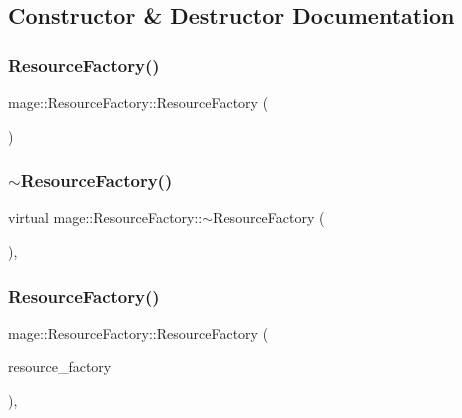 \subsection{Constructor \& Destructor Documentation}
\hypertarget{classmage_1_1_resource_factory_a340bde81096427e319b60063ae771a0d}{}\label{classmage_1_1_resource_factory_a340bde81096427e319b60063ae771a0d} 
\subsubsection{\texorpdfstring{Resource\+Factory()}{ResourceFactory()}\hspace{0.1cm}{\footnotesize\ttfamily [1/2]}}
{\footnotesize\ttfamily mage\+::\+Resource\+Factory\+::\+Resource\+Factory (\begin{DoxyParamCaption}{ }\end{DoxyParamCaption})}

\hypertarget{classmage_1_1_resource_factory_a07b50ac86226772e3c7d119ff9e10043}{}\label{classmage_1_1_resource_factory_a07b50ac86226772e3c7d119ff9e10043} 
\subsubsection{\texorpdfstring{$\sim$\+Resource\+Factory()}{~ResourceFactory()}}
{\footnotesize\ttfamily virtual mage\+::\+Resource\+Factory\+::$\sim$\+Resource\+Factory (\begin{DoxyParamCaption}{ }\end{DoxyParamCaption})\hspace{0.3cm}{\ttfamily [virtual]}, {\ttfamily [default]}}

\hypertarget{classmage_1_1_resource_factory_ac2d236ed7dc16f4ab87d9d8e95d78a94}{}\label{classmage_1_1_resource_factory_ac2d236ed7dc16f4ab87d9d8e95d78a94} 
\subsubsection{\texorpdfstring{Resource\+Factory()}{ResourceFactory()}\hspace{0.1cm}{\footnotesize\ttfamily [2/2]}}
{\footnotesize\ttfamily mage\+::\+Resource\+Factory\+::\+Resource\+Factory (\begin{DoxyParamCaption}\item[{const \hyperlink{classmage_1_1_resource_factory}{Resource\+Factory} \&}]{resource\+\_\+factory }\end{DoxyParamCaption})\hspace{0.3cm}{\ttfamily [private]}, {\ttfamily [delete]}}



